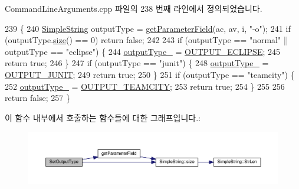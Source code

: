 Command\+Line\+Arguments.\+cpp 파일의 238 번째 라인에서 정의되었습니다.


\begin{DoxyCode}
239 \{
240     \hyperlink{class_simple_string}{SimpleString} outputType = \hyperlink{class_command_line_arguments_acea2499d001a6bd1a67c2ece97a5632c}{getParameterField}(ac, av, i, \textcolor{stringliteral}{"-o"});
241     \textcolor{keywordflow}{if} (outputType.\hyperlink{class_simple_string_aac782da1f912bceb5d8ad00c8dc892ac}{size}() == 0) \textcolor{keywordflow}{return} \textcolor{keyword}{false};
242 
243     \textcolor{keywordflow}{if} (outputType == \textcolor{stringliteral}{"normal"} || outputType == \textcolor{stringliteral}{"eclipse"}) \{
244         \hyperlink{class_command_line_arguments_abc5e0c7954aafcf27c9603b01f608faf}{outputType\_} = \hyperlink{class_command_line_arguments_a4e0517338e6c4a31a2addafc06d4f3a3a7b425fa836322eade87afba2b1a75988}{OUTPUT\_ECLIPSE};
245         \textcolor{keywordflow}{return} \textcolor{keyword}{true};
246     \}
247     \textcolor{keywordflow}{if} (outputType == \textcolor{stringliteral}{"junit"}) \{
248         \hyperlink{class_command_line_arguments_abc5e0c7954aafcf27c9603b01f608faf}{outputType\_} = \hyperlink{class_command_line_arguments_a4e0517338e6c4a31a2addafc06d4f3a3a8103c082cac992e096de965d4151b421}{OUTPUT\_JUNIT};
249         \textcolor{keywordflow}{return} \textcolor{keyword}{true};
250     \}
251     \textcolor{keywordflow}{if} (outputType == \textcolor{stringliteral}{"teamcity"}) \{
252         \hyperlink{class_command_line_arguments_abc5e0c7954aafcf27c9603b01f608faf}{outputType\_} = \hyperlink{class_command_line_arguments_a4e0517338e6c4a31a2addafc06d4f3a3a70f6a6998b8cccac90b3b6935e47aa62}{OUTPUT\_TEAMCITY};
253         \textcolor{keywordflow}{return} \textcolor{keyword}{true};
254     \}
255 
256     \textcolor{keywordflow}{return} \textcolor{keyword}{false};
257 \}
\end{DoxyCode}


이 함수 내부에서 호출하는 함수들에 대한 그래프입니다.\+:
\nopagebreak
\begin{figure}[H]
\begin{center}
\leavevmode
\includegraphics[width=350pt]{class_command_line_arguments_a6ee939cd933ef9906d4724f061a9e409_cgraph}
\end{center}
\end{figure}




